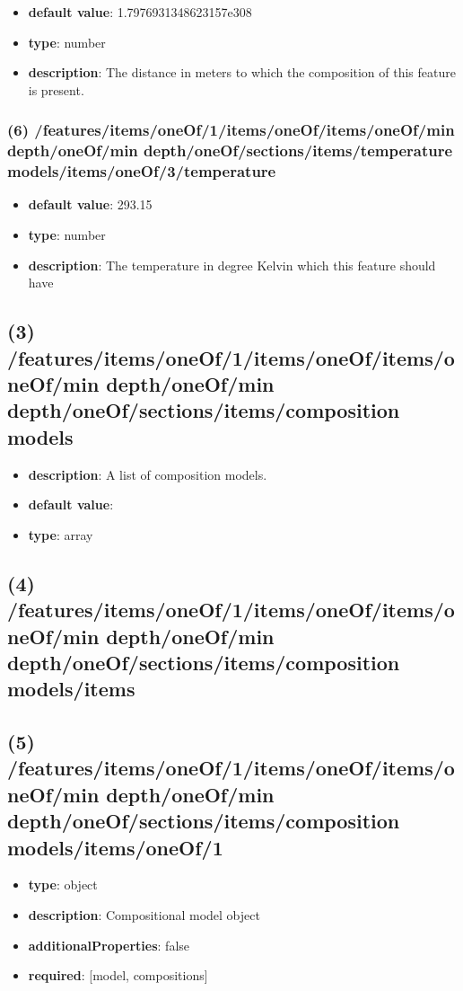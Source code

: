 \begin{itemize}[leftmargin=6em]\item {\bf default value}: 1.7976931348623157e308
\item {\bf type}: number
\item {\bf description}: The distance in meters to which the composition of this feature is present.
\end{itemize}\subsubsection{(6) /features/items/oneOf/1/items/oneOf/items/oneOf/min depth/oneOf/min depth/oneOf/sections/items/temperature models/items/oneOf/3/temperature}
\begin{itemize}[leftmargin=6em]\item {\bf default value}: 293.15
\item {\bf type}: number
\item {\bf description}: The temperature in degree Kelvin which this feature should have
\end{itemize}\subsection{(3) /features/items/oneOf/1/items/oneOf/items/oneOf/min depth/oneOf/min depth/oneOf/sections/items/composition models}
\begin{itemize}[leftmargin=3em]\item {\bf description}: A list of composition models.
\item {\bf default value}: 
\item {\bf type}: array
\end{itemize}\subsection{(4) /features/items/oneOf/1/items/oneOf/items/oneOf/min depth/oneOf/min depth/oneOf/sections/items/composition models/items}

\subsection{(5) /features/items/oneOf/1/items/oneOf/items/oneOf/min depth/oneOf/min depth/oneOf/sections/items/composition models/items/oneOf/1}
\begin{itemize}[leftmargin=5em]\item {\bf type}: object
\item {\bf description}: Compositional model object
\item {\bf additionalProperties}: false
\item {\bf required}: [model, compositions]\end{itemize}
